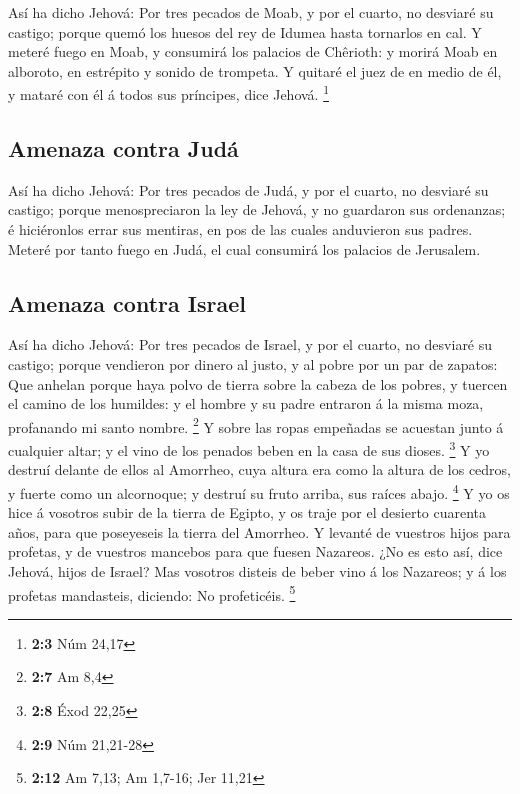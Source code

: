  Así ha dicho Jehová: Por tres pecados de Moab, y por el
cuarto, no desviaré su castigo; porque quemó los huesos del rey de
Idumea hasta tornarlos en cal.  Y meteré fuego en Moab, y
consumirá los palacios de Chêrioth: y morirá Moab en alboroto, en
estrépito y sonido de trompeta.  Y quitaré el juez de en
medio de él, y mataré con él á todos sus príncipes, dice Jehová.
\footnote{\textbf{2:3} Núm 24,17}

\hypertarget{amenaza-contra-juduxe1}{%
\subsection{Amenaza contra Judá}\label{amenaza-contra-juduxe1}}

 Así ha dicho Jehová: Por tres pecados de Judá, y por el
cuarto, no desviaré su castigo; porque menospreciaron la ley de Jehová,
y no guardaron sus ordenanzas; é hiciéronlos errar sus mentiras, en pos
de las cuales anduvieron sus padres.  Meteré por tanto fuego
en Judá, el cual consumirá los palacios de Jerusalem.

\hypertarget{amenaza-contra-israel}{%
\subsection{Amenaza contra Israel}\label{amenaza-contra-israel}}

 Así ha dicho Jehová: Por tres pecados de Israel, y por el
cuarto, no desviaré su castigo; porque vendieron por dinero al justo, y
al pobre por un par de zapatos:  Que anhelan porque haya
polvo de tierra sobre la cabeza de los pobres, y tuercen el camino de
los humildes: y el hombre y su padre entraron á la misma moza,
profanando mi santo nombre. \footnote{\textbf{2:7} Am 8,4} 
Y sobre las ropas empeñadas se acuestan junto á cualquier altar; y el
vino de los penados beben en la casa de sus dioses. \footnote{\textbf{2:8}
  Éxod 22,25}  Y yo destruí delante de ellos al Amorrheo,
cuya altura era como la altura de los cedros, y fuerte como un
alcornoque; y destruí su fruto arriba, sus raíces abajo. \footnote{\textbf{2:9}
  Núm 21,21-28}  Y yo os hice á vosotros subir de la tierra
de Egipto, y os traje por el desierto cuarenta años, para que poseyeseis
la tierra del Amorrheo.  Y levanté de vuestros hijos para
profetas, y de vuestros mancebos para que fuesen Nazareos. ¿No es esto
así, dice Jehová, hijos de Israel?  Mas vosotros disteis de
beber vino á los Nazareos; y á los profetas mandasteis, diciendo: No
profeticéis. \footnote{\textbf{2:12} Am 7,13; Am 1,7-16; Jer 11,21}

